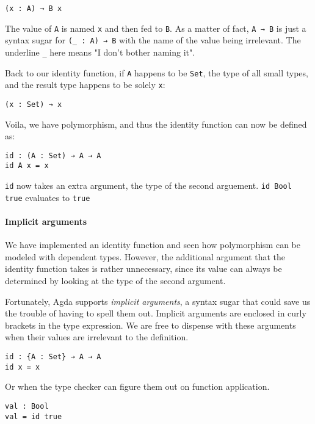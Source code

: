 \documentclass[../thesis.tex]{subfiles}
\begin{document}
\begin{lstlisting}
(x : A) → B x
\end{lstlisting}

The value of {\lstinline|A|} is named {\lstinline|x|} and then fed to {\lstinline|B|}.
As a matter of fact, {\lstinline|A → B|} is just a syntax sugar for {\lstinline|(_ : A) → B|}
with the name of the value being irrelevant. The underline {\lstinline|_|} here
means "I don't bother naming it".

Back to our identity function, if {\lstinline|A|} happens to be {\lstinline|Set|},
the type of all small types, and the result type happens to be solely {\lstinline|x|}:

\begin{lstlisting}
(x : Set) → x
\end{lstlisting}

Voila, we have polymorphism, and thus the identity function can now be defined as:

\begin{lstlisting}
id : (A : Set) → A → A
id A x = x
\end{lstlisting}

{\lstinline|id|} now takes an extra argument, the type of the second arguement.
{\lstinline|id Bool true|} evaluates to {\lstinline|true|}

\paragraph{Implicit arguments}

We have implemented an identity function and seen how polymorphism can be modeled
with dependent types. However, the additional argument that the identity function
takes is rather unnecessary, since its value can always be determined by looking
at the type of the second argument.

Fortunately, Agda supports \textit{implicit arguments}, a syntax sugar that could
save us the trouble of having to spell them out. Implicit arguments are enclosed
in curly brackets in the type expression. We are free to dispense with these arguments
when their values are irrelevant to the definition.

\begin{lstlisting}
id : {A : Set} → A → A
id x = x
\end{lstlisting}

Or when the type checker can figure them out on function application.

\begin{lstlisting}
val : Bool
val = id true
\end{lstlisting}
\end{document}

